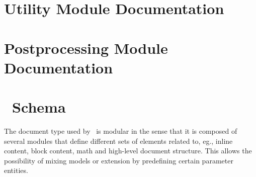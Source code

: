 \documentclass{book}
\begin{document}

















\chapter[Utility Modules]{Utility Module Documentation}\label{utilitymodules}



\chapter[Postprocessing Modules]{Postprocessing Module Documentation}\label{postmodules}


\chapter[Schema]{\LaTeXML\ Schema}\label{schema}
The document type used by \LaTeXML\ is modular in the sense
that it is composed of several modules that define different
sets of elements related to, eg., inline content, block content,
math and high-level document structure.  This allows the possibility
of mixing models or extension by predefining certain parameter entities.
\end{document}
